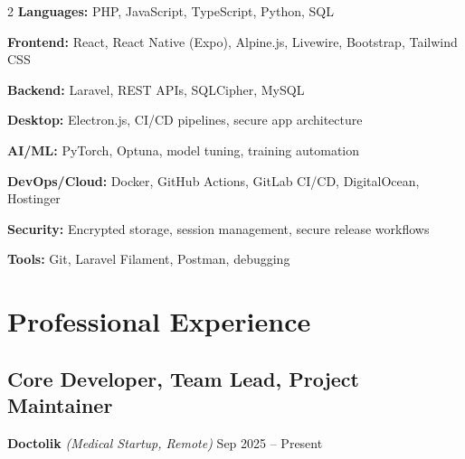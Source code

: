 \documentclass[11pt,a4paper]{article}
\newcommand{\role}[1]{\textbf{#1}}
\newcommand{\company}[1]{\textit{#1}}
\newcommand{\dates}[1]{\hfill{\color{gray}\small #1}}
\begin{document}
\begin{multicols}{2}
    \textbf{\color{darkblue}Languages:} PHP, JavaScript, TypeScript, Python, SQL
    
    \vspace{3pt}
    \textbf{\color{darkblue}Frontend:} React, React Native (Expo), Alpine.js, Livewire, Bootstrap, Tailwind CSS
    
    \vspace{3pt}
    \textbf{\color{darkblue}Backend:} Laravel, REST APIs, SQLCipher, MySQL
    
    \vspace{3pt}
    \textbf{\color{darkblue}Desktop:} Electron.js, CI/CD pipelines, secure app architecture
    
    \columnbreak
    
    \textbf{\color{darkblue}AI/ML:} PyTorch, Optuna, model tuning, training automation
    
    \vspace{3pt}
    \textbf{\color{darkblue}DevOps/Cloud:} Docker, GitHub Actions, GitLab CI/CD, DigitalOcean, Hostinger
    
    \vspace{3pt}
    \textbf{\color{darkblue}Security:} Encrypted storage, session management, secure release workflows
    
    \vspace{3pt}
    \textbf{\color{darkblue}Tools:} Git, Laravel Filament, Postman, debugging
\end{multicols}

\vspace{6pt}

\section{Professional Experience}

\subsection{Core Developer, Team Lead, Project Maintainer}
\role{Doctolik} \company{(Medical Startup, Remote)} \dates{Sep 2025 – Present}
\end{document}
